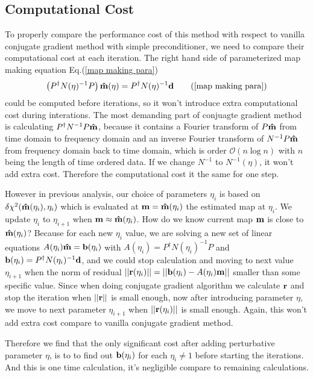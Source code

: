\documentclass[11pt, letterpaper]{article}
\newcommand{\vbd}{\vb{d}}
\newcommand{\vbm}{\vb{m}}
\newcommand{\vbb}{\vb{b}}
\newcommand{\inv}[1]{#1^{-1}}
\newcommand{\hatm}{\vb{\hat{m}}}
\newcommand{\Pdagger}{P^{\dagger}}
\begin{document}
\subsection{Computational Cost}
To properly compare the performance cost of this method with respect to vanilla
conjugate gradient method with simple preconditioner,
we need to compare their computational cost at each iteration.
The right hand side of parameterized map making equation
Eq.(\ref{map making para})
\begin{align}
\qty(\Pdagger \inv{N(\eta)} P)\, \hatm(\eta) 
= \Pdagger \inv{N(\eta)} \vbd \tag{\ref{map making para}}
\end{align}
could be computed before iterations,
so it won't introduce extra computational cost during interations.
The most demanding part of conjuagte gradient method is calculating
$\Pdagger \inv{N} P \hatm$, because it contains a Fourier transform of
$P\hatm$ from time domain to frequency domain and an inverse Fourier transform
of $\inv{N} P \hatm$ from frequency domain back to time domain,
which is order $\mathcal{O}(n\log n)$ with $n$ being the length of time ordered
data.
If we change $\inv{N}$ to $\inv{N}(\eta)$, it won't add extra cost.
Therefore the computational cost it the same for one step.

However in previous analysis, our choice of parameters $\eta_i$ is based on
$\delta\chi^2(\hatm(\eta_i), \eta_i)$ which is evaluated at 
$\vbm = \hatm(\eta_i)$ the estimated map at $\eta_i$.
We update $\eta_i$ to $\eta_{i+1}$ when $\vbm \approx \hatm(\eta_i)$. 
How do we know current map $\vbm$ is close to $\hatm(\eta_i)$? 
Because for each new $\eta_i$ value, we are solving a new set of linear
equations $A(\eta_i) \hatm = \vbb(\eta_i)$ with
$A(\eta_i) = \Pdagger \inv{N(\eta_i)} P$ and 
$\vbb(\eta_i) = \Pdagger \inv{N(\eta_i)} \vbd$,
and we could stop calculation and moving to next value $\eta_{i+1}$ when the 
norm of residual 
$\qty||\vb{r}(\eta_i)|| = \qty||\vbb(\eta_i) - A(\eta_i) \vbm||$
smaller than some specific value.
Since when doing conjugate gradient algorithm we calculate $\vb{r}$ and stop
the iteration when $\qty||\vb{r}||$ is small enough, now after introducing
parameter $\eta$, we move to next parameter $\eta_{i+1}$ when 
$\qty||\vb{r}(\eta_i)||$ is small enough.
Again, this won't add extra cost compare to vanilla conjugate gradient method.

Therefore we find that the only significant cost after adding perturbative
parameter $\eta$, is to to find out $\vb{b}(\eta_i)$ for each $\eta_i\neq1$
before starting the iterations.
And this is one time calculation, it's negligible compare to remaining
calculations.
\end{document}
